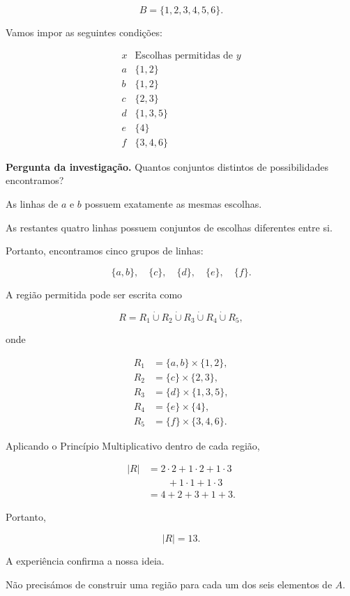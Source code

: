 \documentclass[11pt,a4paper,oneside]{book}
\newcommand{\Pergunta}[1]{\begin{perguntabox}\textbf{Pergunta da investigação.} #1\end{perguntabox}}
\newcommand{\card}[1]{\lvert #1\rvert}
\begin{document}
\[
B=\{1,2,3,4,5,6\}.
\]

Vamos impor as seguintes condições:

\[
\begin{array}{c|c}
x&\text{Escolhas permitidas de }y\\
\hline
a&\{1,2\}\\
b&\{1,2\}\\
c&\{2,3\}\\
d&\{1,3,5\}\\
e&\{4\}\\
f&\{3,4,6\}
\end{array}
\]

\Pergunta{Quantos conjuntos distintos
de possibilidades encontramos?}

As linhas de $a$ e $b$
possuem exatamente as mesmas escolhas.

As restantes quatro linhas
possuem conjuntos de escolhas
diferentes entre si.

Portanto, encontramos cinco
grupos de linhas:

\[
\{a,b\},\quad
\{c\},\quad
\{d\},\quad
\{e\},\quad
\{f\}.
\]

A região permitida pode ser escrita como

\[
R=R_1\mathbin{\dot\cup}R_2
\mathbin{\dot\cup}R_3
\mathbin{\dot\cup}R_4
\mathbin{\dot\cup}R_5,
\]

onde

\[
\begin{aligned}
R_1&=\{a,b\}\times\{1,2\},\\
R_2&=\{c\}\times\{2,3\},\\
R_3&=\{d\}\times\{1,3,5\},\\
R_4&=\{e\}\times\{4\},\\
R_5&=\{f\}\times\{3,4,6\}.
\end{aligned}
\]

Aplicando o Princípio Multiplicativo
dentro de cada região,

\[
\begin{aligned}
\card R
&=2\cdot2+1\cdot2+1\cdot3\\
&\qquad+1\cdot1+1\cdot3\\
&=4+2+3+1+3.
\end{aligned}
\]

Portanto,

\[
\boxed{\card R=13}.
\]

A experiência confirma a nossa ideia.

Não precisámos de construir uma
região para cada um dos seis
elementos de $A$.
\end{document}
